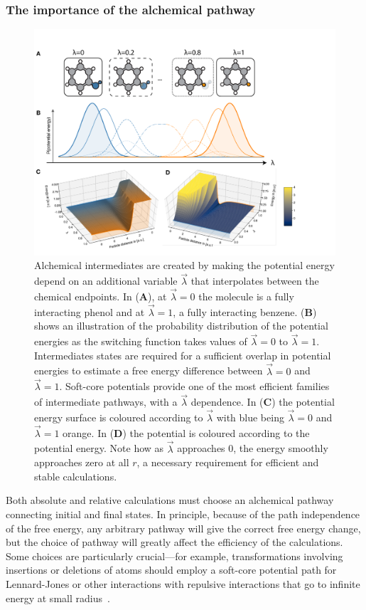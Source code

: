 \documentclass[9pt,bestpractices,pubversion]{livecoms}
\begin{document}
\subsubsection{The importance of the alchemical pathway
\label{sec:important_path}}
\begin{figure}
    \includegraphics[width=0.95\linewidth]{figures/fig7_what_is_lam/Figure.pdf}
    \caption{Alchemical intermediates are created by making the potential energy depend on an additional variable $\vec{\lambda}$ that interpolates between the chemical endpoints. In (\textbf{A}), at $\vec{\lambda}=0$ the molecule is a fully interacting phenol and at $\vec{\lambda}=1$,  a fully interacting benzene. (\textbf{B}) shows an illustration of the probability distribution of the potential energies as the switching function takes values of $\vec{\lambda}=0$ to $\vec{\lambda}=1$. Intermediates states are required for a sufficient overlap in potential energies to estimate a free energy difference between $\vec{\lambda}=0$ and $\vec{\lambda}=1$.
    Soft-core potentials provide one of the most efficient families of intermediate pathways, with a $\vec{\lambda}$ dependence. In (\textbf{C}) the potential energy surface is coloured according to $\vec{\lambda}$ with blue being $\vec{\lambda}=0$ and $\vec{\lambda}=1$ orange. In (\textbf{D}) the potential is coloured according to the potential energy. Note how as $\vec{\lambda}$ approaches 0, the energy smoothly approaches zero at all $r$, a necessary requirement for efficient and stable calculations.  }
    \label{fig:fig_what_is_lambda}
\end{figure}

Both absolute and relative calculations must choose an alchemical pathway connecting initial and final states. In principle, because of the path independence of the free energy, any arbitrary pathway will give the correct free energy change, but the choice of pathway will greatly affect the efficiency of the calculations. Some choices are particularly crucial---for example, transformations involving insertions or deletions of atoms should employ a soft-core potential path for Lennard-Jones or other interactions with repulsive interactions that go to infinite energy at small radius~\cite{beutler1994avoiding, beutler1994molecular,gapsys2012new}.
\end{document}
